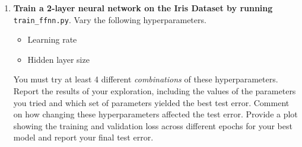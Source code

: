 \documentclass{article}
\begin{document}
\begin{enumerate}
    \item 
    \textbf{Train a 2-layer neural network on the Iris Dataset by running} \texttt{train\_ffnn.py}. 
    Vary the following hyperparameters.
    \begin{itemize}
        \item Learning rate
        \item Hidden layer size
    \end{itemize}
    You must try at least 4 different \textit{combinations} of these hyperparameters. 
    Report the results of your exploration, including the values of the parameters you tried and which set of parameters yielded the best test error. 
    Comment on how changing these hyperparameters affected the test error. 
    Provide a plot showing the training and validation loss across different epochs for your best model and report your final test error.
\end{enumerate}
\end{document}
